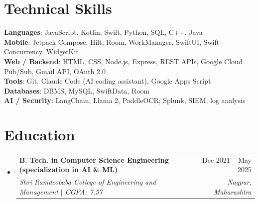 \documentclass[a4paper,11pt]{article}
\makeatletter
\newcommand{\resumeSubheading}[4]{
  \vspace{-1pt}\item
    \begin{tabularx}{0.97\textwidth}[t]{@{}>{\raggedright\arraybackslash}X@{\hspace{0.75em}}r@{}}
      \textbf{#1} & #2 \\
      \textit{\small#3} & \textit{\small #4} \\
    \end{tabularx}\vspace{-3pt}
}
\newcommand{\resumeSubItemListStart}{\begin{itemize}[leftmargin=0.15in, label={}]}
\newcommand{\resumeSubItemListEnd}{\end{itemize}}
\makeatother
\begin{document}
\section{Technical Skills}
  \begin{itemize}[leftmargin=0.15in, label={}]
    \small{\item{
      \textbf{Languages}{: JavaScript, Kotlin, Swift, Python, SQL, C++, Java} \\
      \textbf{Mobile}{: Jetpack Compose, Hilt, Room, WorkManager, SwiftUI, Swift Concurrency, WidgetKit} \\
      \textbf{Web / Backend}{: HTML, CSS, Node.js, Express, REST APIs, Google Cloud Pub/Sub, Gmail API, OAuth 2.0} \\
      \textbf{Tools}{: Git, Claude Code (AI coding assistant), Google Apps Script} \\
      \textbf{Databases}{: DBMS, MySQL, SwiftData, Room} \\
      \textbf{AI / Security}{: LangChain, Llama 2, PaddleOCR; Splunk, SIEM, log analysis}
    }}
  \end{itemize}

\section{Education}
  \resumeSubItemListStart
    \resumeSubheading
      {B. Tech. in Computer Science Engineering (specialization in AI \& ML)}{Dec 2021 -- May 2025}
      {Shri Ramdeobaba College of Engineering and Management $|$ CGPA: 7.57}{Nagpur, Maharashtra}
  \resumeSubItemListEnd
\end{document}
